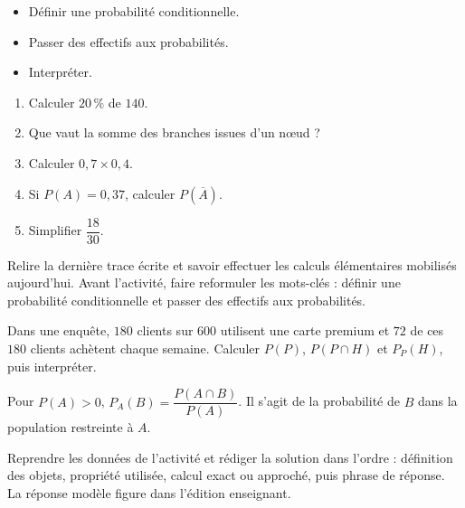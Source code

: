 \begin{objectifs}\begin{itemize}\item Définir une probabilité conditionnelle.\item Passer des effectifs aux probabilités.\item Interpréter.\end{itemize}\end{objectifs}
\begin{automatismes}\begin{enumerate}\item Calculer $20\,\%$ de $140$. \item Que vaut la somme des branches issues d'un nœud ? \item Calculer $0{,}7\times0{,}4$. \item Si $P(A)=0{,}37$, calculer $P(\overline A)$. \item Simplifier $\dfrac{18}{30}$. \end{enumerate}\end{automatismes}
\begin{prerequis}Relire la dernière trace écrite et savoir effectuer les calculs élémentaires mobilisés aujourd'hui. Avant l'activité, faire reformuler les mots-clés : définir une probabilité conditionnelle et passer des effectifs aux probabilités.\end{prerequis}

\begin{activite}
Dans une enquête, $180$ clients sur $600$ utilisent une carte premium et $72$ de ces $180$ clients achètent chaque semaine. Calculer $P(P)$, $P(P\cap H)$ et $P_P(H)$, puis interpréter.

\end{activite}

\begin{traceecrite}Pour $P(A)>0$, $P_A(B)=\dfrac{P(A\cap B)}{P(A)}$. Il s'agit de la probabilité de $B$ dans la population restreinte à $A$.\end{traceecrite}

\begin{exemple}
Reprendre les données de l'activité et rédiger la solution dans l'ordre : définition des objets, propriété utilisée, calcul exact ou approché, puis phrase de réponse. La réponse modèle figure dans l'édition enseignant.
\end{exemple}

